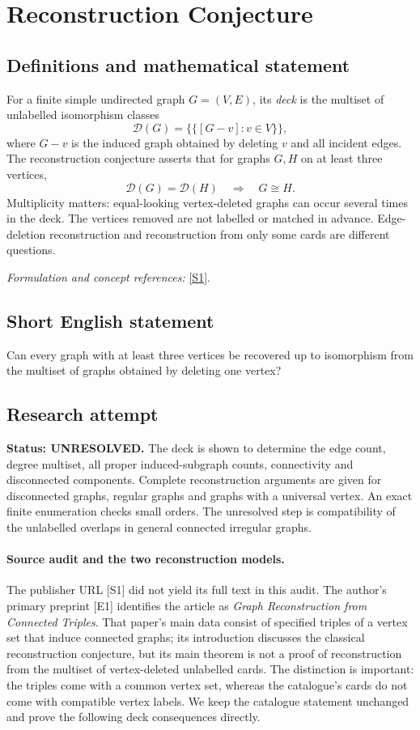 \documentclass[11pt]{article}
\begin{document}
\section*{\texorpdfstring{Reconstruction Conjecture}{Reconstruction Conjecture}}\label{statement}
\subsection{Definitions and mathematical statement}
For a finite simple undirected graph $G=(V,E)$, its \emph{deck} is the multiset of unlabelled isomorphism classes
\[
 \mathcal D(G)=\bigl\{\!\bigl\{[G-v]:v\in V\bigr\}\!\bigr\},
\]
where $G-v$ is the induced graph obtained by deleting $v$ and all incident edges. The reconstruction conjecture asserts that for graphs $G,H$ on at least three vertices,
\[
 \mathcal D(G)=\mathcal D(H)\quad\Longrightarrow\quad G\cong H.
\]
Multiplicity matters: equal-looking vertex-deleted graphs can occur several times in the deck. The vertices removed are not labelled or matched in advance. Edge-deletion reconstruction and reconstruction from only some cards are different questions.
\par\smallskip\textit{Formulation and concept references:} \href{https://www.sciencedirect.com/science/article/abs/pii/S0012365X26000828}{[S1]}.

\subsection{Short English statement}
Can every graph with at least three vertices be recovered up to isomorphism from the multiset of graphs obtained by deleting one vertex?
\subsection{Research attempt}
\textbf{Status: UNRESOLVED.} The deck is shown to determine the edge count, degree multiset, all proper induced-subgraph counts, connectivity and disconnected components. Complete reconstruction arguments are given for disconnected graphs, regular graphs and graphs with a universal vertex. An exact finite enumeration checks small orders. The unresolved step is compatibility of the unlabelled overlaps in general connected irregular graphs.

\paragraph{Source audit and the two reconstruction models.}
The publisher URL [S1] did not yield its full text in this audit. The author's primary preprint [E1] identifies the article as \emph{Graph Reconstruction from Connected Triples}. That paper's main data consist of specified triples of a vertex set that induce connected graphs; its introduction discusses the classical reconstruction conjecture, but its main theorem is not a proof of reconstruction from the multiset of vertex-deleted unlabelled cards. The distinction is important: the triples come with a common vertex set, whereas the catalogue's cards do not come with compatible vertex labels. We keep the catalogue statement unchanged and prove the following deck consequences directly.
\end{document}

